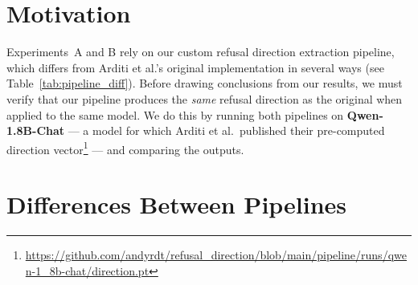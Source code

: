 \documentclass[11pt,a4paper]{article}
\begin{document}
\section{Motivation}

Experiments~A and B rely on our custom refusal direction extraction pipeline, which differs from Arditi et al.'s original implementation in several ways (see Table~\ref{tab:pipeline_diff}). Before drawing conclusions from our results, we must verify that our pipeline produces the \emph{same} refusal direction as the original when applied to the same model. We do this by running both pipelines on \textbf{Qwen-1.8B-Chat} --- a model for which Arditi et al.\ published their pre-computed direction vector\footnote{\url{https://github.com/andyrdt/refusal_direction/blob/main/pipeline/runs/qwen-1_8b-chat/direction.pt}} --- and comparing the outputs.

\section{Differences Between Pipelines}
\label{sec:diff}
\end{document}
